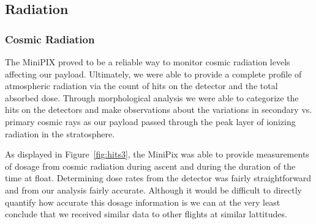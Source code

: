 \subsection{Radiation}
\label{sec:Radiation Results Discussion}

\subsubsection{Cosmic Radiation}
	The MiniPIX proved to be a reliable way to monitor cosmic radiation levels affecting our payload. Ultimately, we were able to provide a complete profile of atmospheric radiation via the count of hits on the detector and the total absorbed dose. Through morphological analysis we were able to categorize the hits on the detectors and make observations about the variations in secondary vs. primary cosmic rays as our payload passed through the peak layer of ionizing radiation in the stratosphere.

	As displayed in Figure~\ref{fig:hits3}, the MiniPix was able to provide measurements of dosage from cosmic radiation during ascent and during the duration of the time at float. Determining dose rates from the detector was fairly straightforward and from our analysis fairly accurate. Although it would be difficult to directly quantify how accurate this dosage information is we can at the very least conclude that we received similar data to other flights at similar lattitudes.	

